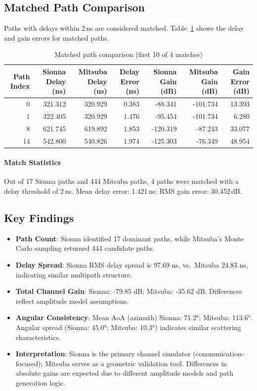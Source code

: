 \subsection{Matched Path Comparison}

Paths with delays within 2\,ns are considered matched. Table~\ref{tab:path_match} shows 
the delay and gain errors for matched paths.

\begin{table}
\caption{Matched path comparison (first 10 of 4 matches)}
\label{tab:path_match}
\begin{tabular}{rrrrrrr}
\toprule
Path Index & Sionna Delay (ns) & Mitsuba Delay (ns) & Delay Error (ns) & Sionna Gain (dB) & Mitsuba Gain (dB) & Gain Error (dB) \\
\midrule
0 & 321.312 & 320.929 & 0.383 & -88.341 & -101.734 & 13.393 \\
1 & 322.405 & 320.929 & 1.476 & -95.454 & -101.734 & 6.280 \\
8 & 621.745 & 619.892 & 1.853 & -120.319 & -87.243 & 33.077 \\
14 & 542.800 & 540.826 & 1.974 & -125.303 & -76.349 & 48.954 \\
\bottomrule
\end{tabular}
\end{table}



\paragraph{Match Statistics}
Out of 17 Sionna paths and 444 Mitsuba paths, 
4 paths were matched with a delay threshold of 2\,ns.
Mean delay error: 1.421\,ns; 
RMS gain error: 30.452\,dB.


\subsection{Key Findings}

\begin{itemize}
  \item \textbf{Path Count}: Sionna identified 17 dominant paths, 
  while Mitsuba's Monte Carlo sampling returned 444 candidate paths.

  \item \textbf{Delay Spread}: Sionna RMS delay spread is 97.69 ns, 
  vs.\ Mitsuba 24.83 ns, indicating similar multipath structure.

  \item \textbf{Total Channel Gain}: Sionna: -79.85 dB; 
  Mitsuba: -35.62 dB. Differences reflect amplitude model assumptions.

  \item \textbf{Angular Consistency}: Mean AoA (azimuth) Sionna: 71.2°; 
  Mitsuba: 113.6°. Angular spread (Sionna: 45.0°; 
  Mitsuba: 10.3°) indicates similar scattering characteristics.

  \item \textbf{Interpretation}: Sionna is the primary channel simulator (communication-focused); 
  Mitsuba serves as a geometric validation tool. Differences in absolute gains are expected 
  due to different amplitude models and path generation logic.
\end{itemize}

